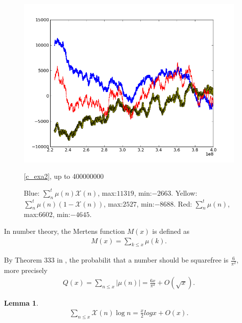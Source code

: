 \documentclass[a4paper,10pt]{amsart}
\newtheorem{lemma}{Lemma}[section]
\newcommand{\X}{\mathcal X}
\begin{document}
\begin{figure}[h]
    \includegraphics[scale=0.5]{400000000_all.png}
    \caption{\cref{c_exa2}, up to 400000000}
    \caption*{Blue: $\sum^{t}_{n} \mu(n)\mathcal{X}(n)$, max:$11319$, min:$
        -2663$.
        Yellow: $\sum^{t}_{n} \mu(n)(1-\mathcal{X}(n))$, max:$2527$, min:$
        -8688$. 
        Red: $\sum^{t}_{n} \mu(n)$, max:$6602$, min:$-4645$.}
\end{figure}

In number theory, the Mertens function $M(x)$ is defined as 
\begin{align*}
    M(x) = \sum_{k \leq x}\mu(k). 
\end{align*}


By Theorem 333 in \cite{HW}, the probabilit that a number should be squarefree is
$\frac{6}{\pi^2}$, more precisely
\begin{align*}
    Q(x) = \sum_{n \leq x}|\mu(n)| = \frac{6x}{\pi^2} + O(\sqrt{x}).
\end{align*}

\begin{lemma}\label{c_lam6}
   \begin{align*}
       \sum_{n \leq x} \X(n)\log n = \frac{x}{2}logx + O(x).
   \end{align*} 
\end{lemma}
\end{document}
